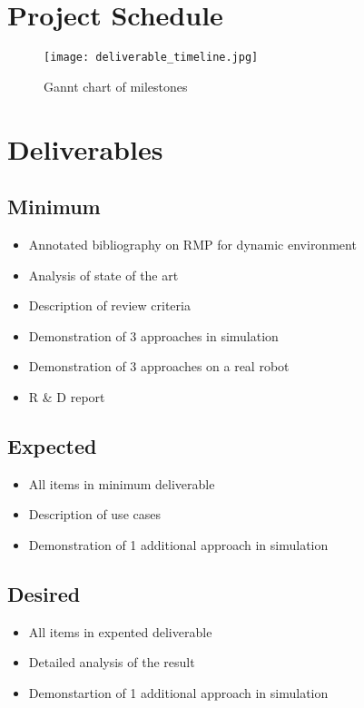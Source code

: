 \documentclass[rnd]{mas_proposal}
\begin{document}
\section{Project Schedule}

\begin{figure}[h!]
    \texttt{[image: deliverable\_timeline.jpg]}
    \caption{Gannt chart of milestones}
    \label{}
\end{figure}

\section{Deliverables}
\subsection{Minimum}

\begin{itemize}
    \item Annotated bibliography on RMP for dynamic environment
    \item Analysis of state of the art
    \item Description of review criteria
    \item Demonstration of 3 approaches in simulation
    \item Demonstration of 3 approaches on a real robot
    \item R \& D report 
\end{itemize}

\subsection{Expected}
\begin{itemize}
    \item All items in minimum deliverable
    \item Description of use cases
    \item Demonstration of 1 additional approach in simulation
\end{itemize}

\subsection{Desired}
\begin{itemize}
    \item All items in expented deliverable
    \item Detailed analysis of the result
    \item Demonstartion of 1 additional approach in simulation
\end{itemize}


\nocite{*}

\end{document}
